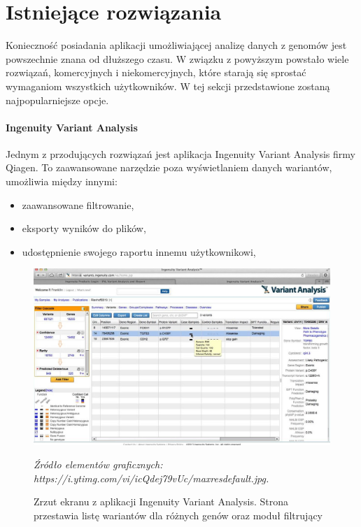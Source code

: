 \documentclass[a4paper,12pt,twoside]{article}
\newcommand{\source}[1]{\caption*{\emph{\footnotesize Źródło elementów graficznych: {#1}.}} }
\begin{document}
\newpage
\section{Istniejące rozwiązania}

Konieczność posiadania aplikacji umożliwiającej analizę danych z genomów
jest powszechnie znana od dłuższego czasu. W związku z powyższym
powstało wiele rozwiązań,
komercyjnych i niekomercyjnych, które starają się sprostać wymaganiom wszystkich użytkowników. W tej sekcji przedstawione zostaną najpopularniejsze opcje.

\paragraph{Ingenuity Variant Analysis} Jednym z przodujących rozwiązań jest aplikacja Ingenuity Variant Analysis \cite{ingenuity} firmy Qiagen. To zaawansowane narzędzie
poza wyświetlaniem danych wariantów, umożliwia między innymi:

\begin{itemize}
\item zaawansowane filtrowanie,
\item eksporty wyników do plików,
\item udostępnienie swojego raportu innemu użytkownikowi,
\end{itemize}

\begin{figure}[H]
\includegraphics[width=\linewidth]{obrazy/exac/ingenuity.jpg}
\caption{Zrzut ekranu z aplikacji Ingenuity Variant Analysis. Strona przestawia listę wariantów dla różnych genów oraz moduł filtrujący}
\source {https://i.ytimg.com/vi/icQdej79vUc/maxresdefault.jpg}
\label{fig:ingenuitypic}
\end{figure}
\newpage
\end{document}
